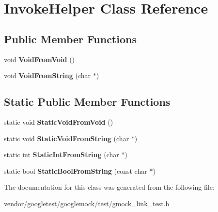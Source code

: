 \hypertarget{classInvokeHelper}{}\section{Invoke\+Helper Class Reference}
\label{classInvokeHelper}
\subsection*{Public Member Functions}
\begin{DoxyCompactItemize}
\item 
void {\bfseries Void\+From\+Void} ()\hypertarget{classInvokeHelper_a6371bcb64a8f01093f6fdef60776a031}{}\label{classInvokeHelper_a6371bcb64a8f01093f6fdef60776a031}

\item 
void {\bfseries Void\+From\+String} (char $\ast$)\hypertarget{classInvokeHelper_a89f02dc384e6b5a7d935b7ea0a81cc9e}{}\label{classInvokeHelper_a89f02dc384e6b5a7d935b7ea0a81cc9e}

\end{DoxyCompactItemize}
\subsection*{Static Public Member Functions}
\begin{DoxyCompactItemize}
\item 
static void {\bfseries Static\+Void\+From\+Void} ()\hypertarget{classInvokeHelper_ae96b5bd7c4fa328d0a87bc986f135fe8}{}\label{classInvokeHelper_ae96b5bd7c4fa328d0a87bc986f135fe8}

\item 
static void {\bfseries Static\+Void\+From\+String} (char $\ast$)\hypertarget{classInvokeHelper_a5e95ce4214e89b180da9953d94396536}{}\label{classInvokeHelper_a5e95ce4214e89b180da9953d94396536}

\item 
static int {\bfseries Static\+Int\+From\+String} (char $\ast$)\hypertarget{classInvokeHelper_a5cfb11cca70ec5a9f59e8b7a4d4c2f85}{}\label{classInvokeHelper_a5cfb11cca70ec5a9f59e8b7a4d4c2f85}

\item 
static bool {\bfseries Static\+Bool\+From\+String} (const char $\ast$)\hypertarget{classInvokeHelper_aef16e38107cd8ddc0a52d7d0ab153211}{}\label{classInvokeHelper_aef16e38107cd8ddc0a52d7d0ab153211}

\end{DoxyCompactItemize}


The documentation for this class was generated from the following file\+:\begin{DoxyCompactItemize}
\item 
vendor/googletest/googlemock/test/gmock\+\_\+link\+\_\+test.\+h\end{DoxyCompactItemize}
